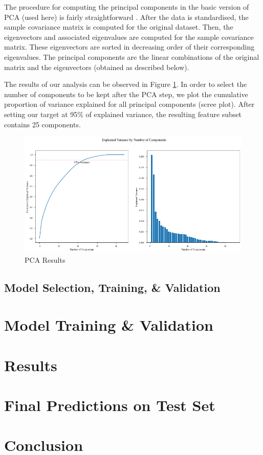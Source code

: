 \documentclass{article}
\begin{document}
The procedure for computing the principal components in the basic version of PCA (used here) is fairly straightforward \cite{jolliffe2016principal}. After the data is standardised, the sample covariance matrix is computed for the original dataset. Then, the eigenvectors and associated eigenvalues are computed for the sample covariance matrix. These eigenvectors are sorted in decreasing order of their corresponding eigenvalues. The principal components are the linear combinations of the original matrix and the eigenvectors (obtained as described below).

The results of our analysis can be observed in Figure \ref{fig:pca_results}. In order to select the number of components to be kept after the PCA step, we plot the cumulative proportion of variance explained for all principal components (scree plot). After setting our target at 95\% of explained variance, the resulting feature subset contains 25 components.
\begin{figure}[ht]
	\includegraphics[scale=0.4]{PCA}
	\centering
	\caption{PCA Results}
	\label{fig:pca_results}
\end{figure}

\subsection{Model Selection, Training, \& Validation}

\section{Model Training \& Validation}
\label{sec:model_training}

\section{Results}
\label{sec:results}

\section{Final Predictions on Test Set}
\label{sec:test}

\section{Conclusion}
\label{sec:conclusion}

 
\end{document}
